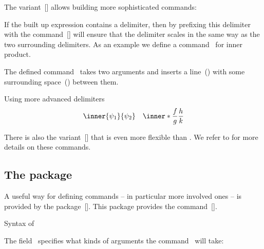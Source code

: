 The variant~[\comname] allows building more sophisticated commands:
If the built up expression contains a delimiter, then by prefixing this delimiter with the command~[\comname] will ensure that the delimiter scales in the same way as the two surrounding delimiters.
As an example we define a command~ for inner product.
The defined command~ takes two arguments and inserts a line~() with some surrounding space~(\comname{,}) between them.
\begin{showlatex}{Using more advanced delimiters}
\[
  \inner{\psi_1}{\psi_2}
  \quad
  \inner*{\frac{f}{g}}{\frac{h}{k}}
\]
\end{showlatex}
There is also the variant~[\comname] that is even more flexible than .
We refer to \cite{mathtools} for more details on these commands.



\subsection{The package~}

A useful way for defining commands -- in particular more involved ones -- is provided by the package~[\packname].
This package provides the command~[\comname].
\begin{showcode}{Syntax of }
\end{showcode}
The field~ specifies what kinds of arguments the command~ will take:


